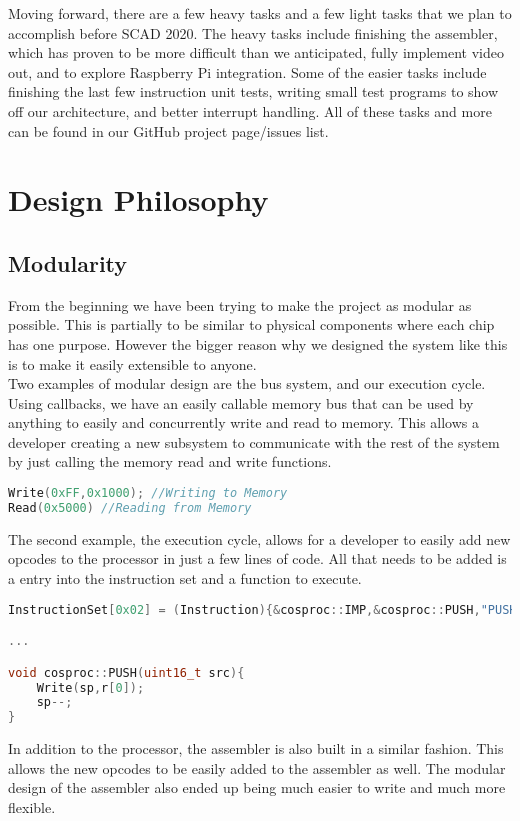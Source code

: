 \documentclass[conference]{IEEEtran}
\begin{document}
Moving forward, there are a few heavy tasks and a few light tasks that we plan to accomplish before SCAD 2020. The heavy tasks include finishing the assembler, which has proven to be more difficult than we anticipated, fully implement video out, and to explore Raspberry Pi integration. Some of the easier tasks include finishing the last few instruction unit tests, writing small test programs to show off our architecture, and better interrupt handling. All of these tasks and more can be found in our GitHub project page/issues list.

\section{Design Philosophy}
\subsection{Modularity}
From the beginning we have been trying to make the project as modular as possible. This is partially to be similar to physical components where each chip has one purpose. However the bigger reason why we designed the system like this is to make it easily extensible to anyone.\\ Two examples of modular design are the bus system, and our execution cycle. Using callbacks, we have an easily callable memory bus that can be used by anything to easily and concurrently write and read to memory. This allows a developer creating a new subsystem to communicate with the rest of the system by just calling the memory read and write functions. 

\begin{lstlisting}[language=C++, caption=Example of the Memory Bus being called]
Write(0xFF,0x1000); //Writing to Memory
Read(0x5000) //Reading from Memory
\end{lstlisting}

The second example, the execution cycle, allows for a developer to easily add new opcodes to the processor in just a few lines of code. All that needs to be added is a entry into the instruction set and a function to execute.
\begin{lstlisting}[language=C++, caption=Example of instruction set entry and function]
InstructionSet[0x02] = (Instruction){&cosproc::IMP,&cosproc::PUSH,"PUSH",1};

...

void cosproc::PUSH(uint16_t src){
	Write(sp,r[0]);
	sp--;
}
\end{lstlisting}
In addition to the processor, the assembler is also built in a similar fashion. This allows the new opcodes to be easily added to the assembler as well. The modular design of the assembler also ended up being much easier to write and much more flexible. 
\end{document}

